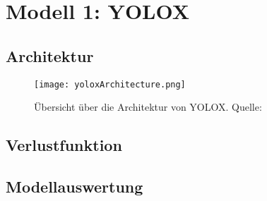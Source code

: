 \chapter{Modell 1: YOLOX}\label{chap:yolox}
\section{Architektur}
\begin{figure}[h]
	\centering
	\texttt{[image: yoloxArchitecture.png]}
	\caption[Übersicht über die Architektur von YOLOX]{Übersicht über die Architektur von YOLOX. Quelle: \cite{yoloArchitecture}}
	\label{fig:yoloxArchitecture.png}
\end{figure}


\section{Verlustfunktion}



\section{Modellauswertung}